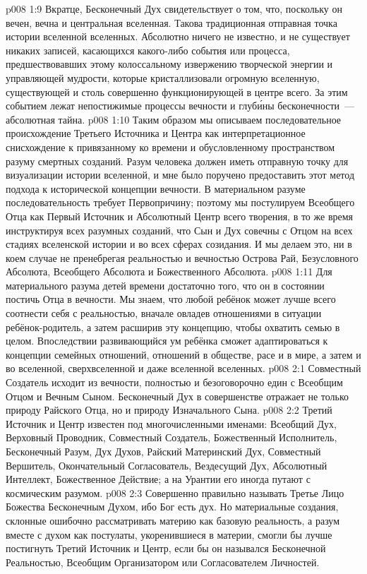 \vs p008 1:9 Вкратце, Бесконечный Дух свидетельствует о том, что, поскольку он вечен, вечна и центральная вселенная. Такова традиционная отправная точка истории вселенной вселенных. Абсолютно ничего не известно, и не существует никаких записей, касающихся какого\hyp{}либо события или процесса, предшествовавших этому колоссальному извержению творческой энергии и управляющей мудрости, которые кристаллизовали огромную вселенную, существующей и столь совершенно функционирующей в центре всего. За этим событием лежат непостижимые процессы вечности и глуб\'ины бесконечности~--- абсолютная тайна.
\vs p008 1:10 \pc Таким образом мы описываем последовательное происхождение Третьего Источника и Центра как интерпретационное снисхождение к привязанному ко времени и обусловленному пространством разуму смертных созданий. Разум человека должен иметь отправную точку для визуализации истории вселенной, и мне было поручено предоставить этот метод подхода к исторической концепции вечности. В материальном разуме последовательность требует Первопричину; поэтому мы постулируем Всеобщего Отца как Первый Источник и Абсолютный Центр всего творения, в то же время инструктируя всех разумных созданий, что Сын и Дух совечны с Отцом на всех стадиях вселенской истории и во всех сферах созидания. И мы делаем это, ни в коем случае не пренебрегая реальностью и вечностью Острова Рай, Безусловного Абсолюта, Всеобщего Абсолюта и Божественного Абсолюта.
\vs p008 1:11 Для материального разума детей времени достаточно того, что он в состоянии постичь Отца в вечности. Мы знаем, что любой ребёнок может лучше всего соотнести себя с реальностью, вначале овладев отношениями в ситуации ребёнок\hyp{}родитель, а затем расширив эту концепцию, чтобы охватить семью в целом. Впоследствии развивающийся ум ребёнка сможет адаптироваться к концепции семейных отношений, отношений в обществе, расе и в мире, а затем и во вселенной, сверхвселенной и даже вселенной вселенных.
\vs p008 2:1 Совместный Создатель исходит из вечности, полностью и безоговорочно един с Всеобщим Отцом и Вечным Сыном. Бесконечный Дух в совершенстве отражает не только природу Райского Отца, но и природу Изначального Сына.
\vs p008 2:2 \pc Третий Источник и Центр известен под многочисленными именами: Всеобщий Дух, Верховный Проводник, Совместный Создатель, Божественный Исполнитель, Бесконечный Разум, Дух Духов, Райский Материнский Дух, Совместный Вершитель, Окончательный Согласователь, Вездесущий Дух, Абсолютный Интеллект, Божественное Действие; а на Урантии его иногда путают с космическим разумом.
\vs p008 2:3 Совершенно правильно называть Третье Лицо Божества Бесконечным Духом, ибо Бог есть дух. Но материальные создания, склонные ошибочно рассматривать материю как базовую реальность, а разум вместе с духом как постулаты, укоренившиеся в материи, смогли бы лучше постигнуть Третий Источник и Центр, если бы он назывался Бесконечной Реальностью, Всеобщим Организатором или Согласователем Личностей.
